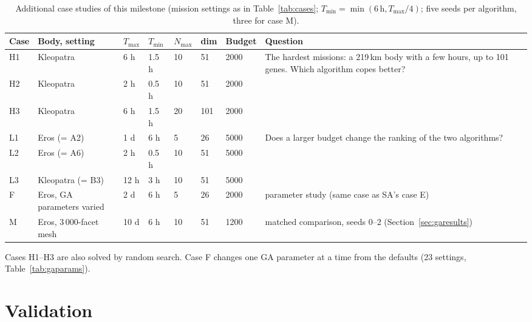 \begin{table}[htbp]
\centering
\caption{Additional case studies of this milestone (mission settings as in Table~\ref{tab:cases};
$T_{\min}=\min(6\,\mathrm{h},T_{\max}/4)$; five seeds per algorithm, three for case M).}
\label{tab:gacases}
\footnotesize
\begin{tabularx}{\textwidth}{@{}p{0.6cm}p{2.6cm}p{0.8cm}p{0.8cm}p{0.7cm}p{0.6cm}p{1.2cm}X@{}}
\toprule
Case & Body, setting & $T_{\max}$ & $T_{\min}$ & $N_{\max}$ & dim & Budget & Question \\
\midrule
H1 & Kleopatra & 6 h & 1.5 h & 10 & 51 & 2000 & \multirow{3}{=}{The hardest missions: a 219\,km body with a few hours, up to 101 genes. Which algorithm copes better?} \\
H2 & Kleopatra & 2 h & 0.5 h & 10 & 51 & 2000 & \\
H3 & Kleopatra & 6 h & 1.5 h & 20 & 101 & 2000 & \\
\midrule
L1 & Eros (= A2) & 1 d & 6 h & 5 & 26 & 5000 & \multirow{3}{=}{Does a larger budget change the ranking of the two algorithms?} \\
L2 & Eros (= A6) & 2 h & 0.5 h & 10 & 51 & 5000 & \\
L3 & Kleopatra (= B3) & 12 h & 3 h & 10 & 51 & 5000 & \\
\midrule
F & Eros, GA parameters varied & 2 d & 6 h & 5 & 26 & 2000 & parameter study (same case as \ac{SA}'s case E) \\
\midrule
M & Eros, 3\,000-facet mesh & 10 d & 6 h & 10 & 51 & 1200 & matched comparison, seeds 0--2 (Section~\ref{sec:garesults}) \\
\bottomrule
\end{tabularx}
\end{table}

Cases H1--H3 are also solved by random search. Case F changes one \ac{GA} parameter at a time from
the defaults (23 settings, Table~\ref{tab:gaparams}).

\section{Validation}
\label{sec:gavalid}

